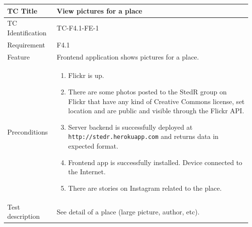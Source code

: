 \documentclass[11pt]{book}
\begin{document}
\begin{table}
  \begin{tabular}{| p{3cm} | p{9.5cm} |} \hline 
    TC Title              & View pictures for a place \\ \hline 
    TC Identification     & TC-F4.1-FE-1 \\ \hline 
    Requirement           & F4.1 \\ \hline 
    Feature               & Frontend application shows pictures for a place. \\ \hline 
    Preconditions         & \begin{enumerate}
                              \item Flickr is up.
                              \item There are some photos posted to the StedR group on Flickr that have any kind of
                               Creative Commons license, set location and are public and visible through the Flickr API.
                              \item Server backend is successfully deployed at \texttt{http://stedr.herokuapp.com} and returns data in expected format.
                              \item Frontend app is successfully installed. Device connected to the Internet.
                              \item There are stories on Instagram related to the place. %
                            \end{enumerate} \\ \hline 

    Test description      & See detail of a place (large picture, author, etc).


\end{tabular}
\end{table}
\end{document}
